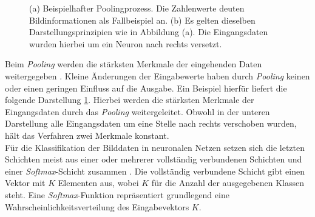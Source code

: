 \begin{figure}[H]
			\caption{(a) Beispielhafter Poolingprozess. Die Zahlenwerte deuten Bildinformationen als Fallbeispiel an. (b) Es gelten dieselben Darstellungsprinzipien wie in Abbildung (a). Die Eingangsdaten wurden hierbei um ein Neuron nach rechts versetzt. \cite{deeplearning}}
			\label{fig: Pooling}
		\end{figure}
	
		Beim \textit{Pooling} werden die stärksten Merkmale der eingehenden Daten weitergegeben \cite{deeplearning}. Kleine Änderungen der Eingabewerte haben durch \textit{Pooling} keinen oder einen geringen Einfluss auf die Ausgabe. Ein Beispiel hierfür liefert die folgende Darstellung \ref{fig: Pooling}. Hierbei werden die stärksten Merkmale der Eingangsdaten durch das \textit{Pooling} weitergeleitet. Obwohl in der unteren Darstellung alle Eingangsdaten um eine Stelle nach rechts verschoben wurden, hält das Verfahren zwei Merkmale konstant.\\
		
		Für die Klassifikation der Bilddaten in neuronalen Netzen setzen sich die letzten Schichten meist aus einer oder mehrerer vollständig verbundenen Schichten und einer \textit{Softmax}-Schicht zusammen \cite{deeplearning}. Die vollständig verbundene Schicht gibt einen Vektor mit $K$ Elementen aus, wobei $K$ für die Anzahl der ausgegebenen Klassen steht. Eine \textit{Softmax}-Funktion repräsentiert grundlegend eine Wahrscheinlichkeitsverteilung des Eingabevektors $K$.\\ 
		
